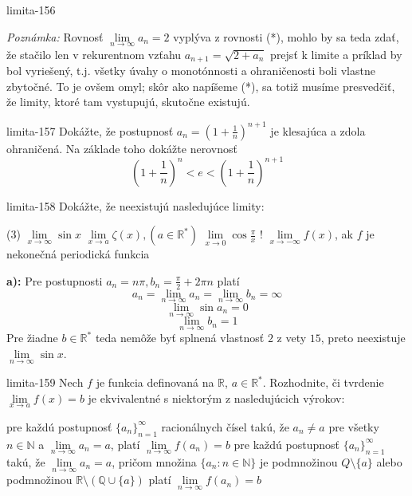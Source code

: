 \begin{defproblem}{limita-156}
\begin{solution}
    \textit{Poznámka:}
    Rovnosť $\lim\limits_{n \rightarrow \infty} a_n=2$ vyplýva z rovnosti (*),
    mohlo by sa teda zdať, že stačilo len v rekurentnom vzťahu
    $a_{n+1}=\sqrt{2+a_n}$ prejsť k limite a príklad by bol vyriešený, t.j.
    všetky úvahy o monotónnosti a ohraničenosti boli vlastne zbytočné. To je
    ovšem omyl; skôr ako napíšeme (*), sa totiž musíme presvedčiť, že limity,
    ktoré tam vystupujú, skutočne existujú.
\end{solution}
\end{defproblem}

\begin{defproblem}{limita-157}
Dokážte, že postupnosť $a_{n}=(1+\frac{1}{n})^{n+1}$ je klesajúca a zdola
ohraničená. Na základe toho dokážte nerovnosť
\[
    (1+\frac{1}{n})^n<e<(1+\frac{1}{n})^{n+1}
\]
\end{defproblem}

\begin{defproblem}{limita-158}
Dokážte, že neexistujú nasledujúce limity:
\begin{tasks}(3)
    \task $\lim\limits_{{x \rightarrow \infty}} \sin x$
    \task $\lim\limits_{{x \rightarrow a}} \zeta (x), (a \in \mathbb{R^*})$
    \task $\lim\limits_{{x \rightarrow 0}} \cos \frac{\pi}{x}$
    \task! $\lim\limits_{{x \rightarrow -\infty}} f(x)$, ak $f$ je nekonečná periodická funkcia
\end{tasks}

\begin{solution}
    \textbf{a):}
    Pre postupnosti $a_n=n\pi,b_n=\frac{\pi}{2}+2\pi n$ platí
    \[
        a_n = \lim\limits_{n \rightarrow \infty} a_n
            = \lim\limits_{n \rightarrow \infty} b_n
            = \infty
    \]
    \[
        \lim\limits_{n \rightarrow \infty} \sin a_n=0
    \]
    \[
        \lim\limits_{n \rightarrow \infty} b_n=1
    \]
    Pre žiadne $b \in \mathbb{R}^*$ teda nemôže byť splnená
    vlastnosť $2$ z vety $15$, preto neexistuje $\lim\limits_{n \rightarrow \infty}
    \sin x$.
\end{solution}
\end{defproblem}

\begin{defproblem}{limita-159}
Nech $f$ je funkcia definovaná na $\mathbb{R}$, $a \in \mathbb{R^*}$. Rozhodnite, či tvrdenie $\lim\limits_{x \rightarrow a} f(x)=b$ je ekvivalentné s niektorým z nasledujúcich výrokov:
\begin{tasks}
\task pre každú postupnosť ${\{a_n\}}_{n=1}^\infty$ racionálnych čísel takú, že $a_n \neq a$ pre všetky $n \in \mathbb{N}$ a $\lim\limits_{n \rightarrow \infty} a_n=a$, platí $\lim\limits_{n \rightarrow \infty} f(a_n)=b$
\task pre každú postupnosť ${\{a_n\}}_{n=1}^\infty$ takú, že $\lim\limits_{n \rightarrow \infty} a_n=a$, pričom množina $\{ a_n : n\in \mathbb{N }\}$ je podmnožinou $Q \setminus \{ a\}$ alebo podmnožinou $\mathbb{R} \setminus (\mathbb{Q} \cup \{ a\})$ platí $\lim\limits_{n \rightarrow \infty} f(a_n)=b$
\end{tasks}
\end{defproblem}

